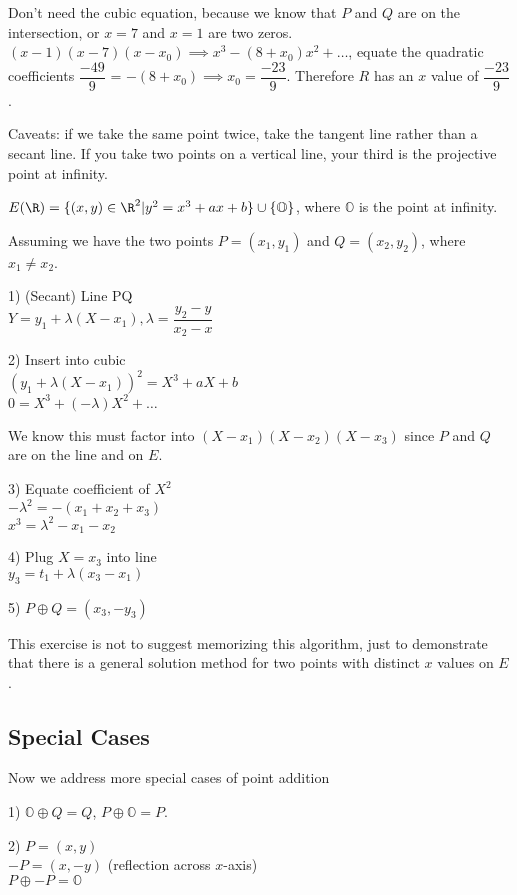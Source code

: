 \documentclass[twoside, 10pt]{article}
\renewcommand{\O}{\mathbb{O}}
\begin{document}
Don't need the cubic equation, because we know that $P$ and $Q$ are on the intersection, or $x = 7$ and $x = 1$ are two zeros. $(x - 1)(x - 7)(x - x_0) \implies x^3 - (8 + x_0)x^2 + \ldots$, equate the quadratic coefficients $\dfrac{-49}{9}$ = $-(8 + x_0) \implies x_0 = \dfrac{-23}{9}$. Therefore $R$ has an $x$ value of $\dfrac{-23}{9}$. 

Caveats: if we take the same point twice, take the tangent line rather than a secant line. If you take two points on a vertical line, your third is the projective point at infinity.

$E(\R) = \{(x, y) \in \R^2 | y^2 = x^3 + ax + b\} \cup \{\O\}$, where $\O$ is the point at infinity.

Assuming we have the two points $P = (x_1, y_1)$ and $Q = (x_2, y_2)$, where $x_1 \neq x_2$.

1) (Secant) Line PQ\\
$Y = y_1 + \lambda(X - x_1), \lambda = \dfrac{y_2 - y}{x_2 - x}$

2) Insert into cubic\\
$(y_1 + \lambda(X - x_1))^2 = X^3 + aX + b$\\
$0 = X^3 + (-\lambda)X^2 + \ldots$

We know this must factor into $(X-x_1)(X-x_2)(X-x_3)$ since $P$ and $Q$ are on the line and on $E$.

3) Equate coefficient of $X^2$\\
$-\lambda^2 = -(x_1 + x_2 + x_3)$\\
$x^3 = \lambda^2 - x_1 - x_2$

4) Plug $X = x_3$ into line\\
$y_3 = t_1 + \lambda(x_3 - x_1)$

5) $P\oplus Q = (x_3, -y_3)$

\begin{rmk}
    This exercise is not to suggest memorizing this algorithm, just to demonstrate that there is a general solution method for two points with distinct $x$ values on $E$.
\end{rmk}

\subsection{Special Cases} Now we address more special cases of point addition

1) $\O \oplus Q = Q$, $P \oplus \O = P$.

2) $P = (x, y)$\\
$-P = (x, -y)$ (reflection across $x$-axis)\\
$P \oplus -P = \O$\\
\end{document}
